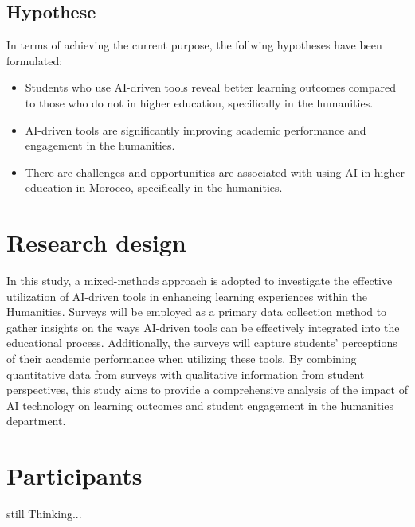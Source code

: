 \subsection{Hypothese}
In terms of achieving the current purpose, the follwing hypotheses have been formulated:
\begin{itemize}
	\item Students who use AI-driven tools reveal better learning outcomes
	      compared to those who do not in higher education, specifically in the humanities.
	\item AI-driven tools are significantly improving academic
	      performance and engagement in the humanities.
	\item There are challenges and opportunities are associated with using AI in higher
	      education in Morocco, specifically in the humanities.
\end{itemize}

\section{Research design}
In this study, a mixed-methods approach is adopted to investigate the effective utilization 
of AI-driven tools in enhancing learning experiences within the Humanities. Surveys will
be employed as a primary data collection method to gather insights on the ways AI-driven 
tools can be effectively integrated into the educational process. Additionally, the surveys 
will capture students' perceptions of their academic performance when utilizing these tools. 
By combining quantitative data from surveys with qualitative information from student perspectives, 
this study aims to provide a comprehensive analysis of the impact of AI technology on learning outcomes 
and student engagement in the humanities department.
\section{Participants}
still Thinking...
